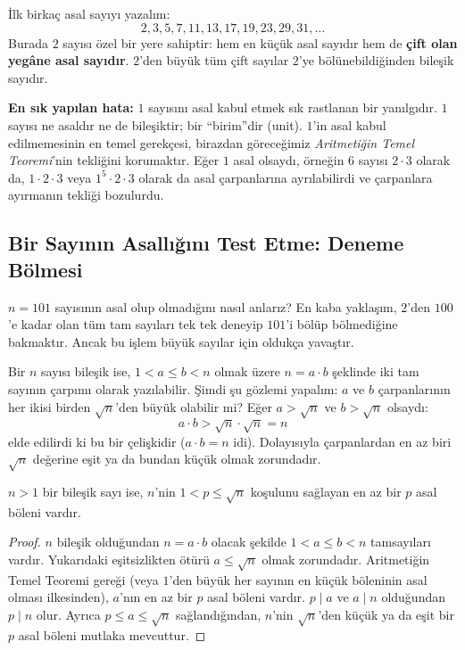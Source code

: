 \begin{example}
İlk birkaç asal sayıyı yazalım:
\[ 2, 3, 5, 7, 11, 13, 17, 19, 23, 29, 31, \dots \]
Burada $2$ sayısı özel bir yere sahiptir: hem en küçük asal sayıdır hem de \textbf{çift olan yegâne asal sayıdır}. $2$'den büyük tüm çift sayılar $2$'ye bölünebildiğinden bileşik sayıdır.
\end{example}

\textbf{En sık yapılan hata:} $1$ sayısını asal kabul etmek sık rastlanan bir yanılgıdır. $1$ sayısı ne asaldır ne de bileşiktir; bir ``birim''dir (unit). $1$'in asal kabul edilmemesinin en temel gerekçesi, birazdan göreceğimiz \emph{Aritmetiğin Temel Teoremi}'nin tekliğini korumaktır. Eğer $1$ asal olsaydı, örneğin $6$ sayısı $2 \cdot 3$ olarak da, $1 \cdot 2 \cdot 3$ veya $1^5 \cdot 2 \cdot 3$ olarak da asal çarpanlarına ayrılabilirdi ve çarpanlara ayırmanın tekliği bozulurdu.

\subsection{Bir Sayının Asallığını Test Etme: Deneme Bölmesi}

$n = 101$ sayısının asal olup olmadığını nasıl anlarız? En kaba yaklaşım, $2$'den $100$'e kadar olan tüm tam sayıları tek tek deneyip $101$'i bölüp bölmediğine bakmaktır. Ancak bu işlem büyük sayılar için oldukça yavaştır.

Bir $n$ sayısı bileşik ise, $1 < a \le b < n$ olmak üzere $n = a \cdot b$ şeklinde iki tam sayının çarpımı olarak yazılabilir. Şimdi şu gözlemi yapalım: $a$ ve $b$ çarpanlarının her ikisi birden $\sqrt{n}$'den büyük olabilir mi?
Eğer $a > \sqrt{n}$ ve $b > \sqrt{n}$ olsaydı:
\[ a \cdot b > \sqrt{n} \cdot \sqrt{n} = n \]
elde edilirdi ki bu bir çelişkidir ($a \cdot b = n$ idi). Dolayısıyla çarpanlardan en az biri $\sqrt{n}$ değerine eşit ya da bundan küçük olmak zorundadır.

\begin{theorem}
$n > 1$ bir bileşik sayı ise, $n$'nin $1 < p \le \sqrt{n}$ koşulunu sağlayan en az bir $p$ asal böleni vardır.
\end{theorem}

\begin{proof}
$n$ bileşik olduğundan $n = a \cdot b$ olacak şekilde $1 < a \le b < n$ tamsayıları vardır. Yukarıdaki eşitsizlikten ötürü $a \le \sqrt{n}$ olmak zorundadır. Aritmetiğin Temel Teoremi gereği (veya $1$'den büyük her sayının en küçük böleninin asal olması ilkesinden), $a$'nın en az bir $p$ asal böleni vardır. $p \mid a$ ve $a \mid n$ olduğundan $p \mid n$ olur. Ayrıca $p \le a \le \sqrt{n}$ sağlandığından, $n$'nin $\sqrt{n}$'den küçük ya da eşit bir $p$ asal böleni mutlaka mevcuttur.
\end{proof}

